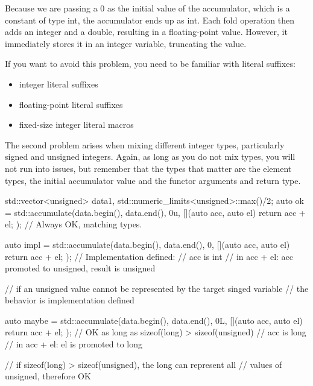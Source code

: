 Because we are passing a 0 as the initial value of the accumulator, which is a constant of type int, the accumulator ends up as int. Each fold operation then adds an integer and a double, resulting in a floating-point value. However, it immediately stores it in an integer variable, truncating the value.

If you want to avoid this problem, you need to be familiar with literal suffixes:

\begin{itemize}
    \item integer literal suffixes
    \item floating-point literal suffixes
    \item fixed-size integer literal macros
\end{itemize}

The second problem arises when mixing different integer types, particularly signed and unsigned integers. Again, as long as you do not mix types, you will not run into issues, but remember that the types that matter are the element types, the initial accumulator value and the functor arguments and return type.

\begin{box-note}
\begin{cppcode}
std::vector<unsigned> data{1, std::numeric_limits<unsigned>::max()/2};
auto ok = std::accumulate(data.begin(), data.end(), 0u, 
                          [](auto acc, auto el) { return acc + el; });
// Always OK, matching types.

auto impl = std::accumulate(data.begin(), data.end(), 0, 
                            [](auto acc, auto el) { return acc + el; });
// Implementation defined:
// acc is int
// in acc + el: acc promoted to unsigned, result is unsigned

// if an unsigned value cannot be represented by the target singed variable
// the behavior is implementation defined

auto maybe = std::accumulate(data.begin(), data.end(), 0L, 
                             [](auto acc, auto el) { return acc + el; });
// OK as long as sizeof(long) > sizeof(unsigned)
// acc is long
// in acc + el: el is promoted to long

// if sizeof(long) > sizeof(unsigned), the long can represent all 
// values of unsigned, therefore OK
\end{cppcode}
\end{box-note}

